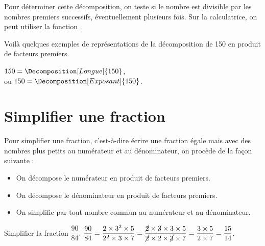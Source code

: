 \medskip

Pour déterminer cette décomposition, on teste si le nombre est divisible par les nombres premiers successifs, éventuellement plusieurs fois. Sur la calculatrice, on peut utiliser la fonction  \fg.

\begin{exemple*1}
   Voilà quelques exemples de représentations de la décomposition de 150 en produit de facteurs premiers. \par
   \quad
   \begin{minipage}{2.5cm}
   \end{minipage}
   \begin{minipage}{7.5cm}
      \qquad\;
   \end{minipage}
   \begin{minipage}{3cm}
      $150 =\Decomposition[Longue]{150}$, \\
      ou $150 =\Decomposition[Exposant]{150}$.
   \end{minipage}
\end{exemple*1}

\section{Simplifier une fraction}

\begin{methode}
   Pour simplifier une fraction, c'est-à-dire écrire une fraction égale mais avec des nombres plus petits au numérateur et au dénominateur, on procède de la façon suivante :
   \begin{itemize}
      \item On décompose le numérateur en produit de facteurs premiers.
      \item On décompose le dénominateur en produit de facteurs premiers.
      \item On simplifie par tout nombre commun au numérateur et au dénominateur.
   \end{itemize}
   \exercice
   Simplifier la fraction $\dfrac{90}{84}$.
   \correction
   $\dfrac{90}{84} =\dfrac{2\times3^2\times5}{2^2\times3\times7} =\dfrac{\cancel{2}\times\cancel{3}\times3\times5}{\cancel{2}\times2\times\cancel{3}\times7} =\dfrac{3\times5}{2\times7} =\dfrac{15}{14}$.
\end{methode}


